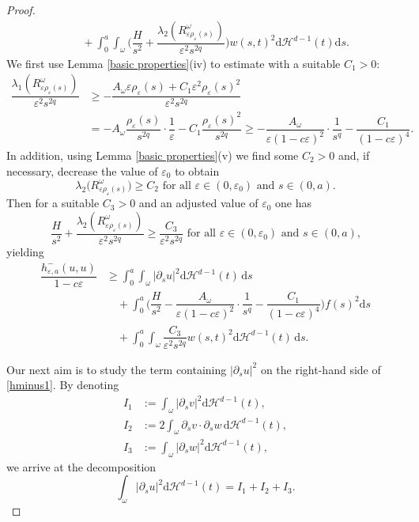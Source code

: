 \documentclass[11pt,oneside,reqno,a4paper]{amsart}
\newcommand{\dd}{\mathrm{d}}
\renewcommand{\H}{\mathcal{H}}
\newcommand{\eps}{\varepsilon}
\theoremstyle{definition}
\begin{document}
\begin{proof}
\begin{align*}
	&\quad+\int_0^a\int_\omega\bigg(\dfrac{H}{s^2}+\dfrac{\lambda_2(R^\omega_{\eps\rho_\eps(s)})}{\eps^2 s^{2q}}\bigg) w(s,t)^2\dd\H^{d-1}(t)\dd s.
\end{align*}
We first use Lemma \ref{basic properties}(iv) to estimate with a suitable $C_1>0$:
\begin{align*}
	\dfrac{\lambda_1(R^\omega_{\eps\rho_\eps(s)})}{\eps^2 s^{2q}}&
	\ge -\dfrac{A_\omega \eps\rho_\eps(s) +C_1\eps^2\rho_\eps(s)^2}{\eps^2s^{2q}}\\
	&=-A_\omega \dfrac{\rho_\eps(s)}{s^{2q}}\cdot\dfrac{1}{\eps}-C_1\dfrac{\rho_\eps(s)^2}{s^{2q}}\ge -\dfrac{A_\omega}{\eps(1-c\eps)^2}\cdot\dfrac{1}{s^q}-\dfrac{C_1}{(1-c\eps)^4}.
\end{align*}
In addition, using Lemma \ref{basic properties}(v) we find some $C_2>0$ and, if necessary, decrease the value of $\eps_0$ to obtain
\[
\lambda_2\big(R^\omega_{\eps\rho_\eps(s)}\big)\ge C_2\text{ for all $\eps\in(0,\eps_0)$ and $s\in(0,a)$.}
\]
Then for a suitable $C_3>0$ and an adjusted value of $\eps_0$ one has
\[
\dfrac{H}{s^2}+\dfrac{\lambda_2(R^\omega_{\eps\rho_\eps(s)})}{\eps^2 s^{2q}}\ge \dfrac{C_3}{\eps^2 s^{2q}}\text{ for all $\eps\in(0,\eps_0)$ and $s\in(0,a)$,}
\]
yielding
\begin{equation}
	\label{hminus1}
\begin{aligned}
	\dfrac{h^-_{\eps,a}(u,u)}{1-c\eps}&\ge \int_0^a\int_\omega |\partial_s u|^2\dd\H^{d-1}(t)\,\dd s\\
	&\quad+\int_0^a\bigg(\dfrac{H}{s^2}
	-\dfrac{A_\omega}{\eps(1-c\eps)^2}\cdot\dfrac{1}{s^q}-\dfrac{C_1}{(1-c\eps)^4}
	\bigg)f(s)^2\dd s\\
	&\quad+\int_0^a\int_\omega \dfrac{C_3}{\eps^2 s^{2q}}
	 w(s,t)^2\dd\H^{d-1}(t)\,\dd s.
\end{aligned}
\end{equation}

Our next aim is to study the term containing $|\partial_s u|^2$ on the right-hand side of \eqref{hminus1}. By denoting
\begin{align*}
	I_1&:=\int_\omega |\partial_s v|^2\dd\H^{d-1}(t),\\
	I_2&:=2\int_\omega \partial_s v\cdot\partial_s w \,\dd\H^{d-1}(t),\\
	I_3&:=\int_\omega |\partial_s w|^2\dd\H^{d-1}(t),
\end{align*}
we arrive at the decomposition
\begin{equation}
	\label{udecomp}
	\int_\omega |\partial_s u|^2\dd\H^{d-1}(t)=I_1+I_2+I_3.
\end{equation}


\end{proof}
\end{document}
